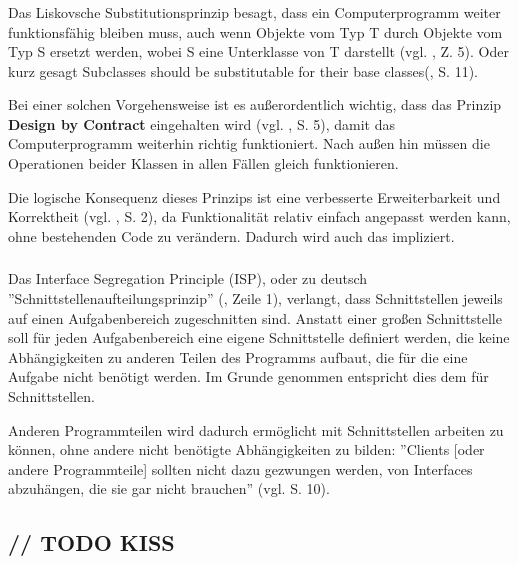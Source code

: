 \subsubsection{\textPrincipleLiskovSubstitution}
\label{\textPrincipleLiskovSubstitution}
Das Liskovsche Substitutionsprinzip besagt, dass ein Computerprogramm weiter funktionsfähig bleiben muss, auch wenn Objekte vom Typ T durch Objekte vom Typ S ersetzt werden, wobei S eine Unterklasse von T darstellt (vgl. \cite{wiki:lsp}, Z. 5). Oder kurz gesagt \glqq Subclasses should be substitutable for their base classes\grqq(\cite{knoernschild2002java}, S. 11).

Bei einer solchen Vorgehensweise ist es außerordentlich wichtig, dass das Prinzip \textbf{Design by Contract} eingehalten wird (vgl. \cite{goll2014architektur}, S. 5), damit das Computerprogramm weiterhin richtig funktioniert. Nach außen hin müssen die Operationen beider Klassen in allen Fällen gleich funktionieren.

Die logische Konsequenz dieses Prinzips ist eine verbesserte Erweiterbarkeit und Korrektheit (vgl. \cite{itDesignersSOLID}, S. 2), da Funktionalität relativ einfach angepasst werden kann, ohne bestehenden Code zu verändern. 
Dadurch wird auch das  impliziert.


\subsubsection{\textPrincipleInterfaceSegregation}
\label{\textPrincipleInterfaceSegregation}
Das Interface Segregation Principle (ISP), oder zu deutsch ''Schnittstellenaufteilungsprinzip'' (\cite{wiki:isp}, Zeile 1), verlangt, dass Schnittstellen jeweils auf einen Aufgabenbereich zugeschnitten sind.
Anstatt einer großen Schnittstelle soll für jeden Aufgabenbereich eine eigene
Schnittstelle definiert werden, die keine Abhängigkeiten zu anderen Teilen des Programms 
aufbaut, die für die eine Aufgabe nicht benötigt werden.
Im Grunde genommen entspricht dies dem   für Schnittstellen.

Anderen Programmteilen wird dadurch ermöglicht mit Schnittstellen arbeiten zu können, ohne andere nicht benötigte Abhängigkeiten zu bilden: ''Clients [oder andere Programmteile] sollten nicht dazu gezwungen werden, von Interfaces abzuhängen, die sie gar nicht brauchen'' (vgl. \cite{goll2014architektur} S. 10).


\subsubsection{\textPrincipleDependencyInversion}
\label{\textPrincipleDependencyInversion}


\subsection{// TODO KISS}